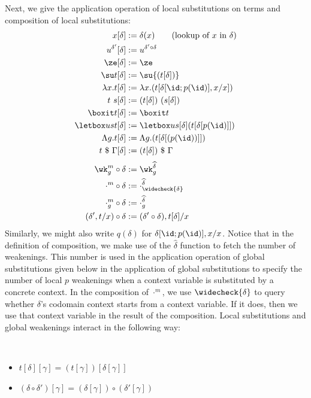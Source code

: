 Next, we give the application operation of local substitutions on terms and
composition of local substitutions:
\begin{align*}
  x[\delta] &:= \delta(x)
              \tag{lookup of $x$ in $\delta$} \\
  u^{\delta'}[\delta] &:= u^{\delta' \circ \delta} \\
  \ze[\delta] &:= \ze \\
  \su t[\delta] &:= \su{(t[\delta])} \\
  \lambda x. t[\delta] &:= \lambda x. (t[\delta[\id; p(\id)], x/x]) \\
  t~s[\delta] &:= (t[\delta])~(s[\delta]) \\
  \boxit t [\delta] &:= \boxit t \\
  \letbox u s t[\delta] &:= \letbox u {s[\delta]} {(t[\delta[p(\id)]])} \\
  \Lambda g. t [\delta] &:= \Lambda g. (t[\delta[(p(\id))]]) \\
  t~\$~\Gamma [\delta] &:= (t[\delta]) ~\$~\Gamma \\[.25em]
  \wk_g^m \circ \delta &:= \wk_g^{\widehat\delta} \\
  \cdot^m \circ \delta &:= \cdot_{\widecheck{\delta}}^{\widehat\delta} \\
  \cdot_{g}^m \circ \delta &:= \cdot_{g}^{\widehat\delta} \\
  (\delta', t/x) \circ \delta &:= (\delta' \circ \delta), t[\delta]/x
\end{align*}
Similarly, we might also write $q(\delta)$ for $\delta[\id; p(\id)], x/x$. %
Notice that in the definition of composition, we make use of the $\widehat\delta$
function to fetch the number of weakenings. %
This number is used in the application operation of global substitutions given below
in the application of global substitutions to specify the number of local $p$
weakenings when a context variable is substituted by a concrete context. %
In the composition of $\cdot^m$, we use $\widecheck{\delta}$ to query whether
$\delta$'s codomain context starts from a context variable. %
If it does, then we use that context variable in the result of the composition. %
Local substitutions and global weakenings interact in the following way:
\begin{lemma} $ $
  \begin{itemize}
  \item $t[\delta][\gamma] = (t[\gamma])[\delta[\gamma]]$
  \item $(\delta \circ \delta')[\gamma] = (\delta[\gamma]) \circ (\delta'[\gamma])$
  \end{itemize}
\end{lemma}

